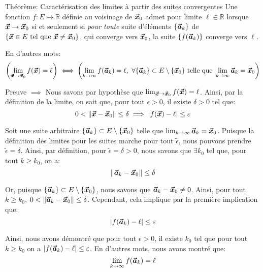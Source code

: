 \documentclass[a4paper]{article}
\begin{document}
\begin{parag}{Théorème: Caractérisation des limites à partir des suites convergentes}
    Une fonction $f: E \mapsto \mathbb{R}$ définie au voisinage de $\bm{\protect\vec{x}}_0$ admet pour limite $\ell \in \mathbb{R}$ lorsque $\bm{\protect\vec{x}} \to \bm{\protect\vec{x}}_0$ si et seulement si \textit{pour toute} suite d'éléments $\left\{\bvec{a}_k\right\}$ de $\left\{\bvec{x} \in E \telque \bvec{x} \neq \bvec{x}_0\right\}$, qui converge vers $\bm{\protect\vec{x}}_0$, la suite $\left\{f\left(\bvec{a}_k\right)\right\}$ converge vers $\ell$.

    En d'autres mots: 
    \[\left(\lim_{\bvec{x} \to \bvec{x}_0} f\left(\bvec{x}\right) = \ell\right) \iff \left(\lim_{k \to \infty} f\left(\bvec{a}_k\right) = \ell,\ \forall \left\{\bvec{a}_k\right\} \subset E \setminus \left\{\bvec{x}_0\right\} \text{ telle que } \lim_{k \to \infty} \bvec{a}_k = \bvec{x}_0\right)\]
    
    \demonstrationaconnaitre

    \begin{subparag}{Preuve $\implies$}
        Nous savons par hypothèse que $\lim_{\bvec{x} \to \bvec{x}_0} f\left(\bvec{x}\right) = \ell$. Ainsi, par la définition de la limite, on sait que, pour tout $\epsilon > 0$, il existe $\delta > 0$ tel que: 
        \[0 < \left\|\bvec{x} - \bvec{x}_0\right\| \leq \delta \implies \left|f\left(\bvec{x}\right) - \ell\right| \leq \epsilon\]
        
        Soit une suite arbitraire $\left\{\bvec{a}_k\right\} \subset E \setminus \left\{\bvec{x}_0\right\}$ telle que $\lim_{k \to \infty} \bm{\protect\vec{a}}_k = \bm{\protect\vec{x}}_0$. Puisque la définition des limites pour les suites marche pour tout $\widetilde{\epsilon}$, nous pouvons prendre $\widetilde{\epsilon} = \delta$. Ainsi, par définition, pour $\widetilde{\epsilon} = \delta > 0$, nous savons que $\exists k_0$ tel que, pour tout $k \geq k_0$, on a: 
        \[\left\|\bvec{a}_k - \bvec{x}_0\right\| \leq \delta\]

        Or, puisque $\left\{\bvec{a}_k\right\} \subset E \setminus \left\{\bvec{x}_0\right\}$, nous savons que $\bm{\protect\vec{a}}_k - \bm{\protect\vec{x}}_0\neq 0$. Ainsi, pour tout $k \geq k_0$, $0 < \left\|\bvec{a}_k - \bvec{x}_0\right\| \leq \delta$. Cependant, cela implique par la première implication que:
        \[\left|f\left(\bvec{a}_k\right) - \ell\right| \leq \epsilon\]
        
        Ainsi, nous avons démontré que pour tout $\epsilon > 0$, il existe $k_0$ tel que pour tout $k \geq k_0$ on a $\left|f\left(\bvec{a}_k\right) - \ell\right| \leq \epsilon$. En d'autres mots, nous avons montré que: 
        \[\lim_{k \to \infty} f\left(\bvec{a}_k\right) = \ell\]
    \end{subparag}


\end{parag}
\end{document}
